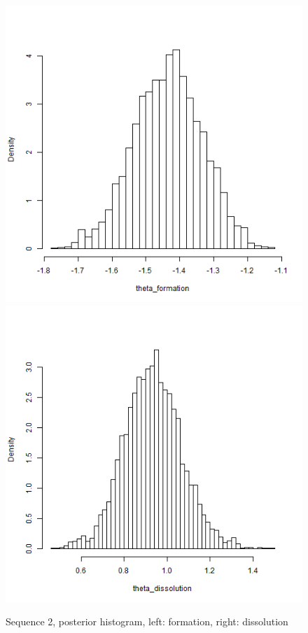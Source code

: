 \documentclass[a4paper, 11pt]{report}
\theoremstyle{definition}
\begin{document}
\begin{figure}[h]
    \begin{center}
        \includegraphics[scale=0.395]{pictures/net2seq_chain1_BSTERGM_formation_histogram.png}
        \includegraphics[scale=0.395]{pictures/net2seq_chain1_BSTERGM_dissolution_histogram.png}
    \caption{Sequence 2, posterior histogram, left: formation, right: dissolution}
    \end{center}
\end{figure}
\end{document}
